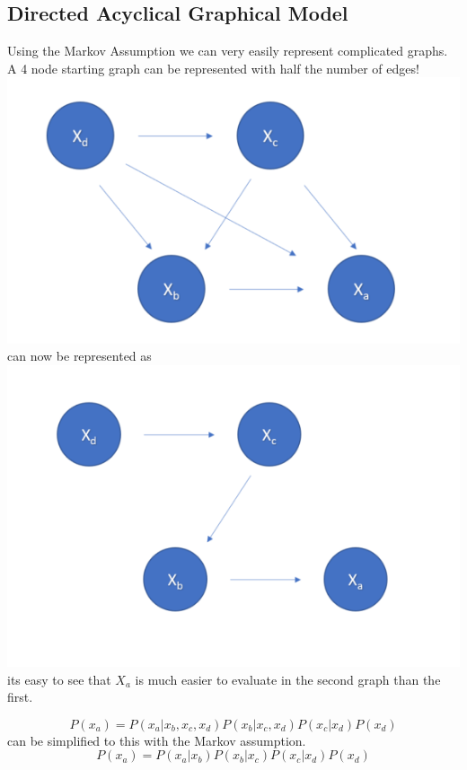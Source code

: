 \documentclass{article}
\begin{document}
\subsection{Directed Acyclical Graphical Model}
Using the Markov Assumption  we can very easily represent complicated graphs.\\
A 4 node starting graph can be represented with half the number of edges!\\
\includegraphics[scale=0.7]{Screenshot_2.png}\\

can now be represented as\\
\includegraphics[scale=0.7]{Screenshot_3.png}\\

its easy to see that $X_a$ is much easier to evaluate in the second graph than the first.

$$P(x_a) = P(x_a| x_b, x_c, x_d) P(x_b| x_c, x_d )P( x_c | x_d) P(x_d)$$
can be simplified to this with the Markov assumption.
$$P(x_a) = P(x_a| x_b) P(x_b| x_c)P( x_c | x_d) P(x_d)$$
\end{document}
